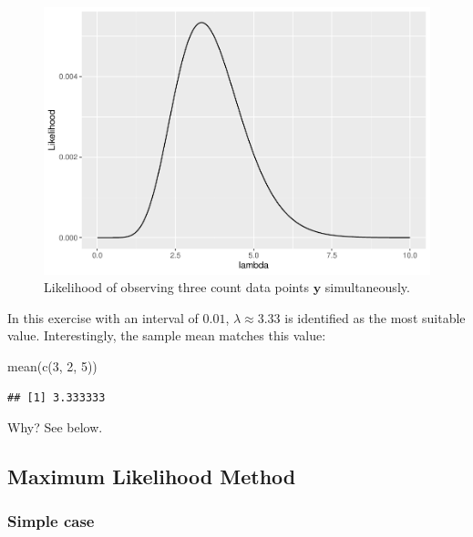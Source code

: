 \documentclass[
]{article}
\newenvironment{Shaded}{\begin{snugshade}}{\end{snugshade}}
\newcommand{\DecValTok}[1]{\textcolor[rgb]{0.00,0.00,0.81}{#1}}
\newcommand{\FunctionTok}[1]{\textcolor[rgb]{0.00,0.00,0.00}{#1}}
\newcommand{\NormalTok}[1]{#1}
\begin{document}
\begin{figure}

{\centering \includegraphics{biostats_files/figure-latex/dpois-likelihood-1} 

}

\caption{Likelihood of observing three count data points $\pmb{y}$ simultaneously.}\label{fig:dpois-likelihood}
\end{figure}

In this exercise with an interval of \(0.01\), \(\lambda \approx 3.33\) is identified as the most suitable value. Interestingly, the sample mean matches this value:

\begin{Shaded}
\begin{Highlighting}[]
\FunctionTok{mean}\NormalTok{(}\FunctionTok{c}\NormalTok{(}\DecValTok{3}\NormalTok{, }\DecValTok{2}\NormalTok{, }\DecValTok{5}\NormalTok{))}
\end{Highlighting}
\end{Shaded}

\begin{verbatim}
## [1] 3.333333
\end{verbatim}

Why? See below.

\hypertarget{maximum-likelihood-method}{%
\subsection{Maximum Likelihood Method}\label{maximum-likelihood-method}}

\hypertarget{simple-case}{%
\subsubsection{Simple case}\label{simple-case}}
\end{document}
